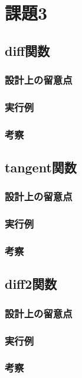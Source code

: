 \documentclass[11pt,a4paper, uplatex]{jsarticle}
\begin{document}
\section{課題3}
\subsection{diff関数}
\subsubsection{設計上の留意点}
\subsubsection{実行例}
\subsubsection{考察}

\subsection{tangent関数}
\subsubsection{設計上の留意点}
\subsubsection{実行例}
\subsubsection{考察}

\subsection{diff2関数}
\subsubsection{設計上の留意点}
\subsubsection{実行例}
\subsubsection{考察}
\end{document}
